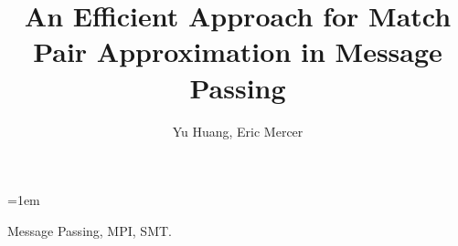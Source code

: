 \documentclass[10pt,peerreview]{IEEEtran}
\begin{document}
\title{An Efficient Approach for Match Pair Approximation in Message Passing}


\begin{comment}
 \author{Yu Huang}
 \affiliation{
  \institution{School of Economic Information Engineering, Southwestern University of Finance and Economics}
  \streetaddress{No.555, Liutai Ave., Wenjiang District}
  \city{Chengdu}
  \state{Sichuan}
  \postcode{611130}
  \country{China}}
 \email{yuhuang@swufe.edu.cn}
\author{Eric Mercer}
 \affiliation{
  \institution{Computer Science Department, Brigham Young University}
  \streetaddress{Brigham Young University}
  \city{Provo}
  \state{Utah}
  \postcode{84602}
  \country{USA}}
\email{egm@byu.edu}
\end{comment}

\author{Yu Huang, Eric Mercer}


\maketitle
%
%
\emergencystretch=1em



\begin{abstract} 

\end{abstract}

   

\begin{IEEEkeywords}
Message Passing, MPI, SMT.
\end{IEEEkeywords}





%

%
%
%







\end{document}
